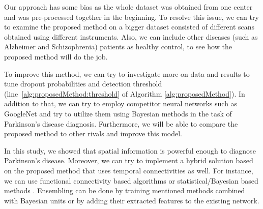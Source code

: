 \documentclass[a4paper,fleqn]{cas-dc}
\begin{document}
Our approach has some bias as the whole dataset was obtained from one center and was pre-processed together in the beginning. To resolve this issue, we can try to examine the proposed method on a bigger dataset consisted of different scans obtained using different instruments. Also, we can include other diseases (such as Alzheimer and Schizophrenia) patients as healthy control, to see how the proposed method will do the job.

To improve this method, we can try to investigate more on data and results to tune dropout probabilities and detection threshold (line~\ref{alg:proposedMethod:threshold} of Algorithm \ref{alg:proposedMethod}). In addition to that, we can try to employ competitor neural networks such as GoogleNet and try to utilize them using Bayesian methods in the task of Parkinson's disease diagnosis. Furthermore, we will be able to compare the proposed method to other rivals and improve this model.

In this study, we showed that spatial information is powerful enough to diagnose Parkinson's disease. Moreover, we can try to implement a hybrid solution based on the proposed method that uses temporal connectivities as well. For instance, we can use functional connectivity based algorithms \cite{Rashid2016} \cite{Shen2014} \cite{Calhoun2004} \cite{GonzalezCastillo2015} \cite{Greicius2002} \cite{Arribas2010} \cite{Leonardi2013} \cite{Liu2015} \cite{Liu2016} \cite{Lehmann2017} \cite{Ryali2012} or statistical/Bayesian based methods \cite{HanchuanPeng2005} \cite{Flandin2007} \cite{Ahmad2016} \cite{Power2012} \cite{Oikonomou2010} \cite{GomezLaberge2011} \cite{Zhang2001} \cite{Oikonomou2012} \cite{Oikonomou2013} \cite{Younes2006} \cite{Suk2016} \cite{Calhoun2012}. Ensembling can be done by training mentioned methods combined with Bayesian units or by adding their extracted features to the existing network.
\end{document}
